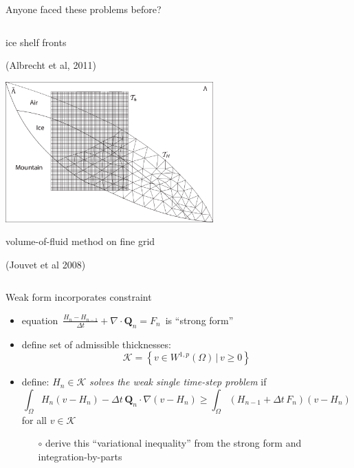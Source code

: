 \documentclass{beamer}
\newcommand\bQ{\mathbf{Q}}
\newcommand{\Div}{\nabla\cdot}
\newcommand{\grad}{\nabla}
\begin{document}
\begin{frame}{Anyone faced these problems before?}
{\begin{columns}
\begin{column}{0.6\textwidth}
\small ice shelf fronts

\tiny (Albrecht et al, 2011)

\small \medskip
\includegraphics[width=0.6\textwidth,keepaspectratio=true]{jouvet-two-grids}

\small volume-of-fluid method on fine grid

\tiny (Jouvet et al 2008)
\end{column}
\end{columns}}

\end{frame}


\begin{frame}{Weak form incorporates constraint}

  \begin{itemize}
  \item equation \,$\frac{H_n - H_{n-1}}{\Delta t} + \Div \bQ_n = F_n$\, is ``strong form''
  \item define set of admissible thicknesses:
    $$\mathcal{K} = \left\{v \in W^{1,p}(\Omega) \,\Big|\, v\ge 0\right\}$$
  \item<2> define: $H_n \in \mathcal{K}$ \emph{solves the weak single time-step problem} if
    $$\int_\Omega H_n (v - H_n) - \Delta t\, \bQ_n \cdot \grad(v - H_n) \ge \int_\Omega \left(H_{n-1} + \Delta t\, F_n\right) (v - H_n)$$
  for all $v \in \mathcal{K}$
  \small
  \medskip
    \begin{itemize}
    \item[$\circ$] derive this ``variational inequality'' from the strong form and integration-by-parts
    \end{itemize}
  \end{itemize}
\end{frame}
\end{document}
